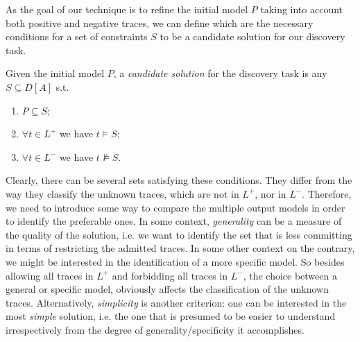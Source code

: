  As the goal of our technique is to refine the initial model $P$ taking into account both positive and negative traces, we can define which are the necessary conditions for a set of constraints $S$ to be a candidate solution for our discovery task.

\theoremstyle{definition}
\begin{definition}{}\label{def:cand}
Given the initial model $P$, a \emph{candidate solution} for the discovery task is any $S\subseteq D[A]$ s.t.
\begin{enumerate} [label=\textit{(\roman*)}]
  \item $P\subseteq S$;
  \item $\forall t\in L^+$ we have $t\models S$;
  \item $\forall t\in L^-$ we have $t\not\models S$.
\end{enumerate}
\end{definition}


 Clearly, there can be several sets satisfying these conditions. They differ from the way they classify the unknown traces, which are not in $L^+$, nor in $L^-$. Therefore, we need to introduce some way to compare the multiple output models in order to identify the preferable ones.
%
In some context, \emph{generality} can be a measure of the quality of the solution, i.e. we want to identify the set that is less committing in terms of restricting the admitted traces. In some other context on the contrary, we might be interested in the identification of a more specific model. So besides allowing all traces in $L^+$ and forbidding all traces in $L^-$, the choice between a general or specific model, obviously affects the classification of the unknown traces. Alternatively, \emph{simplicity} is another criterion: one can be interested in the most \emph{simple} solution, i.e. the one that is presumed to be easier to understand irrespectively from the degree of generality/specificity it accomplishes.

